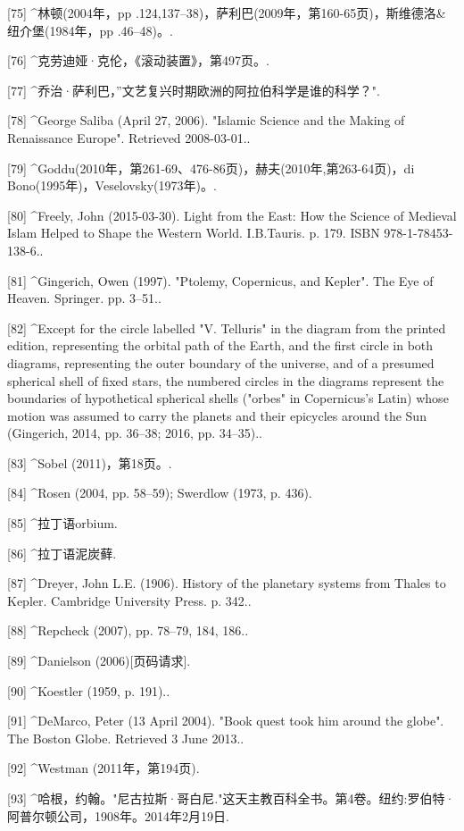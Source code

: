 [75]
^林顿(2004年，pp .124,137–38)，萨利巴(2009年，第160-65页)，斯维德洛&纽介堡(1984年，pp .46–48)。.

[76]
^克劳迪娅·克伦，《滚动装置》，第497页。.

[77]
^乔治·萨利巴，”文艺复兴时期欧洲的阿拉伯科学是谁的科学？".

[78]
^George Saliba (April 27, 2006). "Islamic Science and the Making of Renaissance Europe". Retrieved 2008-03-01..

[79]
^Goddu(2010年，第261-69、476-86页)，赫夫(2010年,第263-64页)，di Bono(1995年)，Veselovsky(1973年)。.

[80]
^Freely, John (2015-03-30). Light from the East: How the Science of Medieval Islam Helped to Shape the Western World. I.B.Tauris. p. 179. ISBN 978-1-78453-138-6..

[81]
^Gingerich, Owen (1997). "Ptolemy, Copernicus, and Kepler". The Eye of Heaven. Springer. pp. 3–51..

[82]
^Except for the circle labelled "V. Telluris" in the diagram from the printed edition, representing the orbital path of the Earth, and the first circle in both diagrams, representing the outer boundary of the universe, and of a presumed spherical shell of fixed stars, the numbered circles in the diagrams represent the boundaries of hypothetical spherical shells ("orbes" in Copernicus's Latin) whose motion was assumed to carry the planets and their epicycles around the Sun (Gingerich, 2014, pp. 36–38; 2016, pp. 34–35)..

[83]
^Sobel (2011)，第18页。.

[84]
^Rosen (2004, pp. 58–59); Swerdlow (1973, p. 436).

[85]
^拉丁语orbium.

[86]
^拉丁语泥炭藓.

[87]
^Dreyer, John L.E. (1906). History of the planetary systems from Thales to Kepler. Cambridge University Press. p. 342..

[88]
^Repcheck (2007), pp. 78–79, 184, 186..

[89]
^Danielson (2006)[页码请求].

[90]
^Koestler (1959, p. 191)..

[91]
^DeMarco, Peter (13 April 2004). "Book quest took him around the globe". The Boston Globe. Retrieved 3 June 2013..

[92]
^Westman (2011年，第194页).

[93]
^哈根，约翰。"尼古拉斯·哥白尼."这天主教百科全书。第4卷。纽约:罗伯特·阿普尔顿公司，1908年。2014年2月19日.

